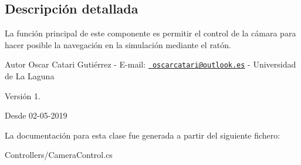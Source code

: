 \subsection{Descripción detallada}
La función principal de este componente es permitir el control de la cámara para hacer posible la navegación en la simulación mediante el ratón. \begin{DoxyAuthor}{Autor}
Oscar Catari Gutiérrez -\/ E-\/mail\+: \href{mailto:oscarcatari@outlook.es}{\texttt{ oscarcatari@outlook.\+es}} -\/ Universidad de La Laguna 
\end{DoxyAuthor}
\begin{DoxyVersion}{Versión}
1. 
\end{DoxyVersion}
\begin{DoxySince}{Desde}
02-\/05-\/2019 
\end{DoxySince}


La documentación para esta clase fue generada a partir del siguiente fichero\+:\begin{DoxyCompactItemize}
\item 
Controllers/Camera\+Control.\+cs\end{DoxyCompactItemize}

